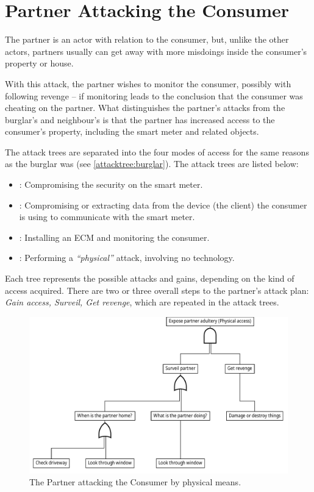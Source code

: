 
\section{Partner Attacking the Consumer}
The partner is an actor with relation to the consumer, but, unlike the other actors, partners usually can get away with more misdoings inside the consumer's property or house.

With this attack, the partner wishes to monitor the consumer, possibly with following revenge -- if monitoring leads to the conclusion that the consumer was cheating on the partner.
What distinguishes the partner's attacks from the burglar's and neighbour's is that the partner has increased access to the consumer's property, including the smart meter and related objects.

The attack trees are separated into the four modes of access for the same reasons as the burglar was (see \cref{attacktree:burglar}).
The attack trees are listed below:
\begin{itemize}
  \item {}: Compromising the security on the smart meter.
  \item {}: Compromising or extracting data from the device (the client) the consumer is using to communicate with the smart meter.
  \item {}: Installing an ECM and monitoring the consumer.
  \item {}: Performing a \emph{``physical''} attack, involving no technology.
\end{itemize}

Each tree represents the possible attacks and gains, depending on the kind of access acquired.
There are two or three overall steps to the partner's attack plan: \textit{Gain access, Surveil, Get revenge}, which are repeated in the attack trees.

\begin{figure}[h]
  \centering
  \includegraphics[width=\textwidth]{figures/graphviz/partner_vs_consumer_physical.pdf}
  \caption{The Partner attacking the Consumer by physical means.}
  \label{fig:attack_trees:partner:cheater_physical}
\end{figure}

